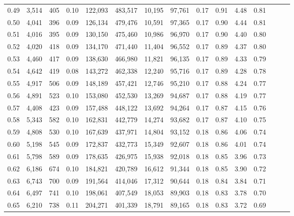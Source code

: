 \begin{tabular}{rrrrrrrrrrrrrrr}
0.49 &   3,514 &    405 &  0.10 &  122,093 &  483,517 &   10,195 &   97,761 &  0.17 &  0.91 &  4.48 &      0.81 \\
0.50 &   4,041 &    396 &  0.09 &  126,134 &  479,476 &   10,591 &   97,365 &  0.17 &  0.90 &  4.44 &      0.81 \\
0.51 &   4,016 &    395 &  0.09 &  130,150 &  475,460 &   10,986 &   96,970 &  0.17 &  0.90 &  4.40 &      0.80 \\
0.52 &   4,020 &    418 &  0.09 &  134,170 &  471,440 &   11,404 &   96,552 &  0.17 &  0.89 &  4.37 &      0.80 \\
0.53 &   4,460 &    417 &  0.09 &  138,630 &  466,980 &   11,821 &   96,135 &  0.17 &  0.89 &  4.33 &      0.79 \\
0.54 &   4,642 &    419 &  0.08 &  143,272 &  462,338 &   12,240 &   95,716 &  0.17 &  0.89 &  4.28 &      0.78 \\
0.55 &   4,917 &    506 &  0.09 &  148,189 &  457,421 &   12,746 &   95,210 &  0.17 &  0.88 &  4.24 &      0.77 \\
0.56 &   4,891 &    523 &  0.10 &  153,080 &  452,530 &   13,269 &   94,687 &  0.17 &  0.88 &  4.19 &      0.77 \\
0.57 &   4,408 &    423 &  0.09 &  157,488 &  448,122 &   13,692 &   94,264 &  0.17 &  0.87 &  4.15 &      0.76 \\
0.58 &   5,343 &    582 &  0.10 &  162,831 &  442,779 &   14,274 &   93,682 &  0.17 &  0.87 &  4.10 &      0.75 \\
0.59 &   4,808 &    530 &  0.10 &  167,639 &  437,971 &   14,804 &   93,152 &  0.18 &  0.86 &  4.06 &      0.74 \\
0.60 &   5,198 &    545 &  0.09 &  172,837 &  432,773 &   15,349 &   92,607 &  0.18 &  0.86 &  4.01 &      0.74 \\
0.61 &   5,798 &    589 &  0.09 &  178,635 &  426,975 &   15,938 &   92,018 &  0.18 &  0.85 &  3.96 &      0.73 \\
0.62 &   6,186 &    674 &  0.10 &  184,821 &  420,789 &   16,612 &   91,344 &  0.18 &  0.85 &  3.90 &      0.72 \\
0.63 &   6,743 &    700 &  0.09 &  191,564 &  414,046 &   17,312 &   90,644 &  0.18 &  0.84 &  3.84 &      0.71 \\
0.64 &   6,497 &    741 &  0.10 &  198,061 &  407,549 &   18,053 &   89,903 &  0.18 &  0.83 &  3.78 &      0.70 \\
0.65 &   6,210 &    738 &  0.11 &  204,271 &  401,339 &   18,791 &   89,165 &  0.18 &  0.83 &  3.72 &      0.69 \\

\end{tabular}
